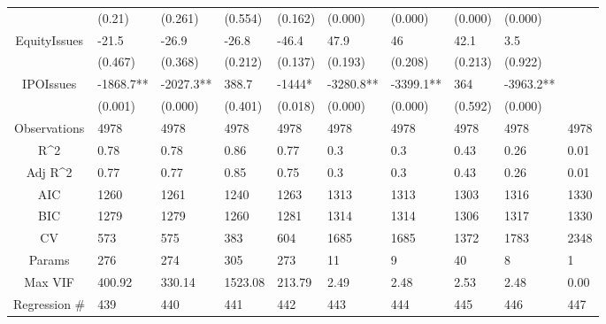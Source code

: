 \documentclass{article}
\begin{document}
\begin{table}[H]
\begin{tabular}{|clllllllll|}
   & (0.21) & (0.261) & (0.554) & (0.162) & (0.000) & (0.000) & (0.000) & (0.000) &  \\ 
  EquityIssues & -21.5 & -26.9 & -26.8 & -46.4 & 47.9 & 46 & 42.1 & 3.5 &  \\ 
   & (0.467) & (0.368) & (0.212) & (0.137) & (0.193) & (0.208) & (0.213) & (0.922) &  \\ 
  IPOIssues & -1868.7** & -2027.3** & 388.7 & -1444* & -3280.8** & -3399.1** & 364 & -3963.2** &  \\ 
   & (0.001) & (0.000) & (0.401) & (0.018) & (0.000) & (0.000) & (0.592) & (0.000) &  \\ 
  \hline 
 Observations & 4978 & 4978 & 4978 & 4978 & 4978 & 4978 & 4978 & 4978 & 4978 \\ 
  R^2 & 0.78 & 0.78 & 0.86 & 0.77 & 0.3 & 0.3 & 0.43 & 0.26 & 0.01 \\ 
  Adj R^2 & 0.77 & 0.77 & 0.85 & 0.75 & 0.3 & 0.3 & 0.43 & 0.26 & 0.01 \\ 
  AIC & 1260 & 1261 & 1240 & 1263 & 1313 & 1313 & 1303 & 1316 & 1330 \\ 
  BIC & 1279 & 1279 & 1260 & 1281 & 1314 & 1314 & 1306 & 1317 & 1330 \\ 
  CV & 573 & 575 & 383 & 604 & 1685 & 1685 & 1372 & 1783 & 2348 \\ 
  Params & 276 & 274 & 305 & 273 & 11 & 9 & 40 & 8 & 1 \\ 
  Max VIF & 400.92 & 330.14 & 1523.08 & 213.79 & 2.49 & 2.48 & 2.53 & 2.48 & 0.00 \\ 
  Regression \# & 439 & 440 & 441 & 442 & 443 & 444 & 445 & 446 & 447 \\ 
   \hline
\end{tabular}
 
\end{table}
\end{document}
